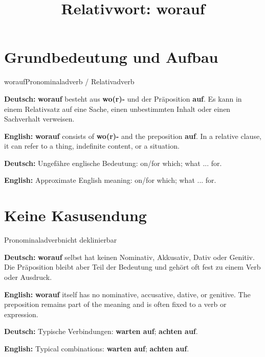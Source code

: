 \documentclass[a4paper,11pt]{article}
\title{Relativwort: \glqq worauf\grqq{}}
\date{}
\newcommand{\GermanText}[1]{\textbf{Deutsch: }#1\par}
\newcommand{\EnglishText}[1]{{\small\color{SoftGray}\textbf{English: }#1\par}}
\begin{document}
\maketitle

\tableofcontents

\newpage

\section{Grundbedeutung und Aufbau}

\begin{grammarentry}{worauf}{Pronominaladverb / Relativadverb}

\GermanText{\textbf{worauf} besteht aus \textbf{wo(r)-} und der Präposition \textbf{auf}. Es kann in einem Relativsatz auf eine Sache, einen unbestimmten Inhalt oder einen Sachverhalt verweisen.}

\EnglishText{\textbf{worauf} consists of \textbf{wo(r)-} and the preposition \textbf{auf}. In a relative clause, it can refer to a thing, indefinite content, or a situation.}

\GermanText{Ungefähre englische Bedeutung: \glqq on/for which; what ... for\grqq{}.}

\EnglishText{Approximate English meaning: \glqq on/for which; what ... for\grqq{}.}

\end{grammarentry}

\section{Keine Kasusendung}

\begin{grammarentry}{Pronominaladverb}{nicht deklinierbar}

\GermanText{\textbf{worauf} selbst hat keinen Nominativ, Akkusativ, Dativ oder Genitiv. Die Präposition bleibt aber Teil der Bedeutung und gehört oft fest zu einem Verb oder Ausdruck.}

\EnglishText{\textbf{worauf} itself has no nominative, accusative, dative, or genitive. The preposition remains part of the meaning and is often fixed to a verb or expression.}

\GermanText{Typische Verbindungen: \textbf{warten auf}; \textbf{achten auf}.}

\EnglishText{Typical combinations: \textbf{warten auf}; \textbf{achten auf}.}

\end{grammarentry}
\end{document}
